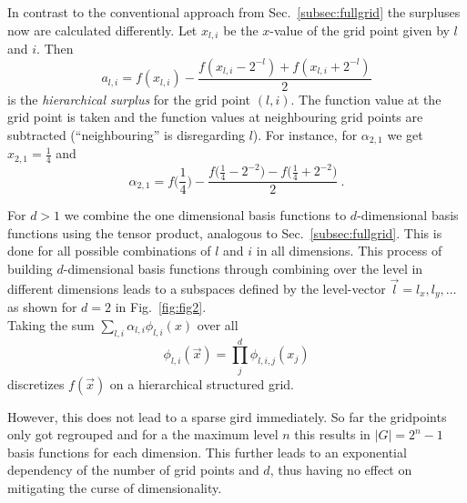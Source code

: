 In contrast to the conventional approach from
Sec.~\ref{subsec:fullgrid} the surpluses now are calculated
differently.
Let $x_{l,i}$ be the $x$-value of the grid point given by $l$ and $i$. Then
$$a_{l,i} = f(x_{l,i}) - \frac{f(x_{l,i} - 2^{-l}) + f(x_{l,i} + 2^{-l})}{2}$$
is the \emph{hierarchical surplus} for the grid point $(l,i)$. The function
value at the grid point is taken and the function values
at neighbouring grid points are subtracted (``neighbouring''
is disregarding $l$). For instance, for $\alpha_{2,1}$ we get $x_{2,1} =
\frac{1}{4}$ and
$$\alpha_{2,1} = f\Big(\frac{1}{4}\Big) - \frac{f\Big(\frac{1}{4} - 2^{-2}\Big) - f\Big(\frac{1}{4} + 2^{-2}\Big)}{2} \ .$$
\par
For $d > 1$ we combine the one dimensional basis functions
to $d$-dimensional basis functions using the tensor product,
analogous to Sec.~\ref{subsec:fullgrid}. This is done for all possible combinations
of $l$ and $i$ in all dimensions.
This process of building $d$-dimensional basis functions
through combining over the level in different dimensions leads to a
subspaces defined by the level-vector $\vec{l} = {l_x, l_y, \dots}$
as shown for $d = 2$ in Fig.~\ref{fig:fig2}. \\
Taking the sum $\sum_{l,i} \alpha_{l,i}\phi_{l,i}(x)$ over all
$$\phi_{l,i}(\vec{x}) = \prod_j^d{\phi_{l,i,j}(x_j)}$$
discretizes $f(\vec{x})$ on a hierarchical structured grid.
\par
However, this does not lead to a sparse gird immediately. So far the
gridpoints only got regrouped and for a the maximum level $n$ this
results in $|G| = 2^{n} - 1$ basis functions for each dimension.
This further leads to an exponential dependency of the number of grid points
and $d$, thus having no effect on mitigating the curse of dimensionality.



